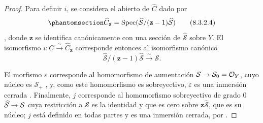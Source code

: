 \documentclass[oneside,10pt]{amsart}
\makeatletter
\newcommand{\ega@arrow}[2]{\mathchoice{#1}{#2}{#2}{#2}}
\renewcommand{\to}{\ega@arrow{\longrightarrow}{\rightarrow}}
\let\EGAOriginalLabel\label
\renewcommand{\label}[1]{\phantomsection\EGAOriginalLabel{#1}}
\makeatother
\begin{document}
\begin{proof}
Para definir $i$, se considera el abierto de $\widehat{C}$ dado por
\begin{equation}
\label{II.8.3.2.4-fr}
  \widehat{C}_{\mathbf{z}}=
  \operatorname{Spec}(\widehat{\mathcal{S}}/(\mathbf{z}-1)\widehat{\mathcal{S}})
\tag{8.3.2.4}
\end{equation}
, donde $\mathbf{z}$ se identifica canónicamente con una sección de $\widehat{\mathcal{S}}$ sobre $Y$.
El isomorfismo $i:C\xrightarrow{\sim}\widehat{C}_{\mathbf{z}}$ corresponde entonces al isomorfismo canónico 
\[
  \widehat{\mathcal{S}}/(\mathbf{z}-1)\widehat{\mathcal{S}}
  \xrightarrow{\sim}\mathcal{S}.
\]

El morfismo $\varepsilon$ corresponde al homomorfismo de aumentación $\mathcal{S}\to\mathcal{S}_0=\mathcal{O}_Y$, cuyo núcleo es $\mathcal{S}_+$ , y, como este homomorfismo es sobreyectivo, $\varepsilon$ es una inmersión cerrada .
Finalmente, $j$ corresponde  al homomorfismo sobreyectivo de grado $0$ $\widehat{\mathcal{S}}\to\mathcal{S}$ cuya restricción a $\mathcal{S}$ es la identidad y que es cero sobre $\mathbf{z}\widehat{\mathcal{S}}$, que es su núcleo;
$j$ está definido en todas partes y es una inmersión cerrada, por .


\end{proof}
\end{document}
